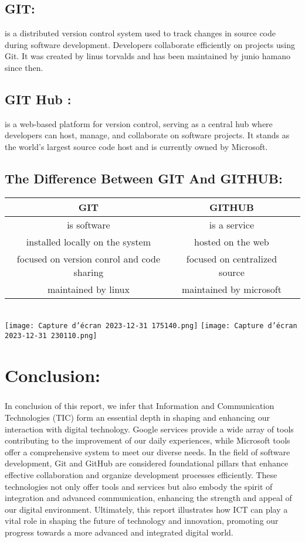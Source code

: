 \documentclass[a4paper,11pt]{report}
\begin{document}
\section{GIT:} is a distributed version control system used to track changes in source code during software development. Developers collaborate efficiently on projects using Git.
It was created by linus torvalds and has been maintained by junio hamano since then.
\section{GIT Hub :} is a web-based platform for version control, serving as a central hub where developers can host, manage, and collaborate on software projects. It stands as the world's largest source code host and is currently owned by Microsoft.

\section{The Difference Between GIT And GITHUB:}

\begin{tabular}{|c|c|c|}
\hline
    \textbf{GIT} &\textbf{GITHUB}\\
    \hline
    is software&is a service\\
    \hline
    installed locally on the system& hosted on the web\\
    \hline
    focused on version conrol and code sharing & focused on centralized source\\
    \hline
    maintained by linux & maintained by microsoft\\
    \hline
    \end{tabular}\\


\texttt{[image: Capture d’écran 2023-12-31 175140.png]}
\texttt{[image: Capture d’écran 2023-12-31 230110.png]}
\clearpage
\chapter{Conclusion:}
\paragraph{}
\Large
In conclusion of this report, we infer that Information and Communication Technologies (TIC) form an essential depth in shaping and enhancing our interaction with digital technology. Google services provide a wide array of tools contributing to the improvement of our daily experiences, while Microsoft tools offer a comprehensive system to meet our diverse needs. In the field of software development, Git and GitHub are considered foundational pillars that enhance effective collaboration and organize development processes efficiently. These technologies not only offer tools and services but also embody the spirit of integration and advanced communication, enhancing the strength and appeal of our digital environment. Ultimately, this report illustrates how ICT can play a vital role in shaping the future of technology and innovation, promoting our progress towards a more advanced and integrated digital world.
\end{document}
